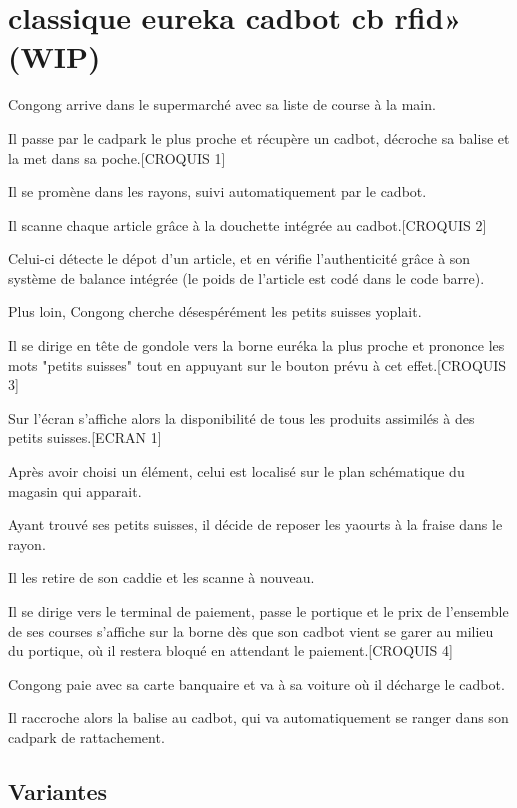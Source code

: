 \section{classique eureka cadbot cb rfid» (WIP)}

\startitemize
\item Congong arrive dans le supermarché avec sa liste de course à la main.
\item Il passe par le cadpark le plus proche et récupère un cadbot, décroche sa balise et la met dans sa poche.[CROQUIS 1]
\item Il se promène dans les rayons, suivi automatiquement par le cadbot.
\item Il scanne chaque article grâce à la douchette intégrée au cadbot.[CROQUIS 2]
\item Celui-ci détecte le dépot d'un article, et en vérifie l'authenticité grâce à son système 
de balance intégrée (le poids de l'article est codé dans le code barre).
\item Plus loin, Congong cherche désespérément les petits suisses yoplait.
\item Il se dirige en tête de gondole vers la borne euréka la plus proche et prononce les mots "petits suisses" tout en appuyant sur le bouton prévu à cet effet.[CROQUIS 3]
\item Sur l'écran s'affiche alors la disponibilité de tous les produits assimilés à des petits suisses.[ECRAN 1]
\item Après avoir choisi un élément, celui est localisé sur le plan schématique du magasin qui apparait.
\item Ayant trouvé ses petits suisses, il décide de reposer les yaourts à la fraise dans le rayon.
\item Il les retire de son caddie et les scanne à nouveau.
\item Il se dirige vers le terminal de paiement, passe le portique et le prix de l'ensemble de ses courses s'affiche sur la borne dès que son cadbot vient se garer au milieu du portique, où il restera bloqué en attendant le paiement.[CROQUIS 4]
\item Congong paie avec sa carte banquaire et va à sa voiture où il décharge le cadbot.
\item Il raccroche alors la balise au cadbot, qui va automatiquement se ranger dans son cadpark de rattachement.
\stopitemize

\subsection{Variantes}

